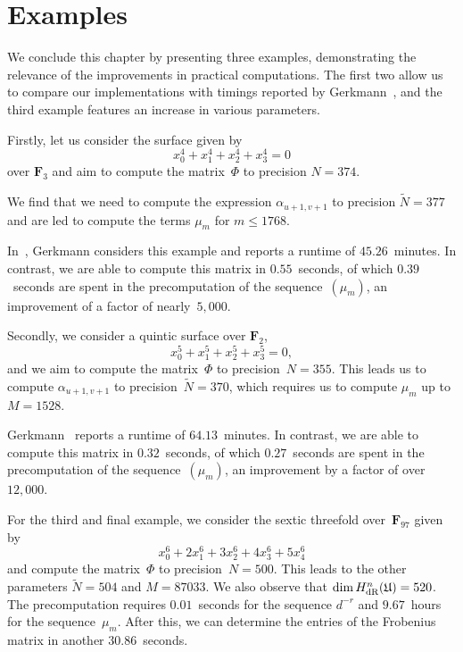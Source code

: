 
\section{Examples}

We conclude this chapter by presenting three examples, demonstrating the 
relevance of the improvements in practical computations.  The first two 
allow us to compare our implementations with timings reported by 
Gerkmann~\citep{Gerkmann2007}, and the third example features an increase 
in various parameters.

Firstly, let us consider the surface given by 
\begin{equation*}
x_0^4 + x_1^4 + x_2^4 + x_3^4 = 0
\end{equation*}
over $\mathbf{F}_3$ and aim to compute the matrix~$\Phi$ 
to precision $N = 374$.

We find that we need to compute the expression $\alpha_{u+1,v+1}$ to 
precision $\tilde{N} = 377$ and are led to compute the terms $\mu_m$ for 
$m \leq 1768$.

In~\citep[\S 7.4]{Gerkmann2007}, Gerkmann considers this example 
and reports a runtime of $45.26$~minutes.  In contrast, we are able 
to compute this matrix in $0.55$~seconds, of which $0.39$~seconds are 
spent in the precomputation of the sequence~$(\mu_m)$, an improvement 
of a factor of nearly~$5,000$.

Secondly, we consider a quintic surface over $\mathbf{F}_2$, 
\begin{equation*}
x_0^5 + x_1^5 + x_2^5 + x_3^5 = 0,
\end{equation*}
and we aim to compute the matrix~$\Phi$ to precision~$N = 355$.  This 
leads us to compute $\alpha_{u+1,v+1}$ to precision~$\tilde{N} = 370$, 
which requires us to compute $\mu_{m}$ up to $M = 1528$.

Gerkmann~\citep[\S 7.6]{Gerkmann2007} reports a runtime of 
$64.13$~minutes.  In contrast, we are able to compute this matrix 
in $0.32$~seconds, of which $0.27$~seconds are spent in the precomputation 
of the sequence~$(\mu_m)$, an improvement by a factor of over~$12,000$.

For the third and final example, we consider the sextic threefold 
over~$\mathbf{F}_{97}$ given by 
\begin{equation*}
x_0^6 + 2 x_1^6 + 3 x_2^6 + 4 x_3^6 + 5 x_4^6
\end{equation*}
and compute the matrix~$\Phi$ to precision~$N = 500$.  This leads to the 
other parameters $\tilde{N} = 504$ and $M = 87033$.  We also observe 
that $\dim H_{\text{dR}}^{n}(\mathfrak{U}) = 520$.  The precomputation requires 
$0.01$~seconds for the sequence $d^{-r}$ and $9.67$~hours for the 
sequence~$\mu_m$.  After this, we can determine the entries of the 
Frobenius matrix in another $30.86$~seconds.

